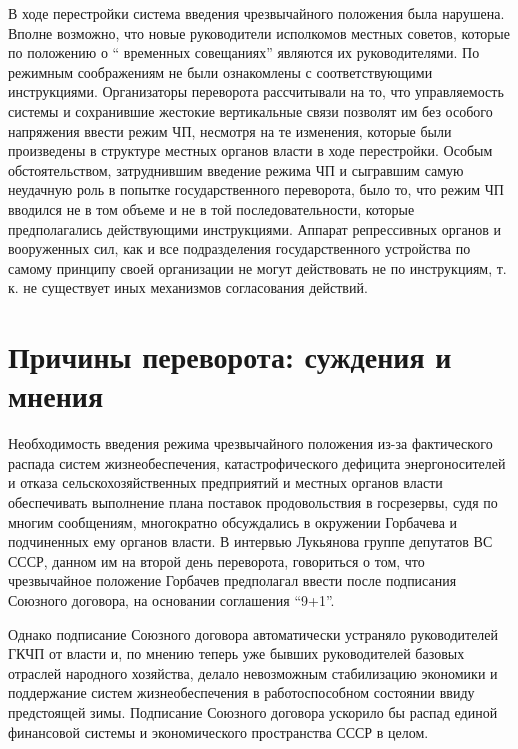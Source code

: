 \documentclass[12pt]{extarticle}
\begin{document}
В ходе перестройки система введения чрезвычайного положения была нарушена. Вполне возможно, что новые руководители исполкомов местных советов, которые по положению о “ временных совещаниях” являются их руководителями. По режимным соображениям не были ознакомлены с соответствующими инструкциями. Организаторы переворота рассчитывали на то, что управляемость системы и сохранившие жестокие вертикальные связи позволят им без особого напряжения ввести режим ЧП, несмотря на те изменения, которые были произведены в структуре местных органов власти в ходе перестройки. Особым обстоятельством, затруднившим введение режима ЧП и сыгравшим самую неудачную роль в попытке государственного переворота, было то, что режим ЧП вводился не в том объеме и не в той последовательности, которые предполагались действующими инструкциями. Аппарат репрессивных органов и вооруженных сил, как и все подразделения государственного устройства по самому принципу своей организации не могут действовать не по инструкциям, т. к. не существует иных механизмов согласования действий.

\section {Причины переворота: суждения и мнения}
Необходимость введения режима чрезвычайного положения из-за фактического распада систем жизнеобеспечения, катастрофического дефицита энергоносителей и отказа сельскохозяйственных предприятий и местных органов власти обеспечивать выполнение плана поставок продовольствия в госрезервы, судя по многим сообщениям, многократно обсуждались в окружении Горбачева и подчиненных ему органов власти. В интервью Лукьянова группе депутатов ВС СССР, данном им на второй день переворота, говориться о том, что чрезвычайное положение Горбачев предполагал ввести после подписания Союзного договора, на основании соглашения “9+1”.

Однако подписание Союзного договора автоматически устраняло руководителей ГКЧП от власти и, по мнению теперь уже бывших руководителей базовых отраслей народного хозяйства, делало невозможным стабилизацию экономики и поддержание систем жизнеобеспечения в работоспособном состоянии ввиду предстоящей зимы. Подписание Союзного договора ускорило бы распад единой финансовой системы и экономического пространства СССР в целом.
\end{document}

